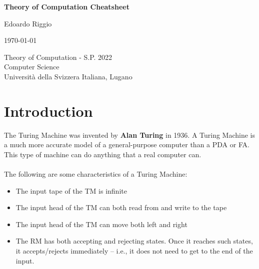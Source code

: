\documentclass{article}
\begin{document}
\begin{titlepage}
    \begin{center}
        \vspace*{1cm}
        
        \Huge
        \textbf{Theory of Computation Cheatsheet}
        
        \vspace{0.5cm}
        \LARGE
        
        \vspace{.5cm}
        
        Edoardo Riggio
   		  \vspace{1.5cm}
       
        \vfill
        
        \today
        
        \vspace{.8cm}
          \Large
          Theory of Computation - S.P. 2022 \\
        Computer Science\\
        Universit\`{a} della Svizzera Italiana, Lugano\\
        
    \end{center}
\end{titlepage}

\tableofcontents

\newpage

\section{Introduction}
The Turing Machine was invented by \textbf{Alan Turing} in 1936. A Turing Machine is a much more accurate model of a general-purpose computer than a PDA or FA. This type of machine can do anything that a real computer can. \\ \\
The following are some characteristics of a Turing Machine:

\begin{itemize}
	\item The input tape of the TM is infinite
	\item The input head of the TM can both read from and write to the tape
	\item The input head of the TM can move both left and right
	\item The RM has both accepting and rejecting states. Once it reaches such states, it accepts/rejects immediately -- i.e., it does not need to get to the end of the input.
\end{itemize}
\end{document}
